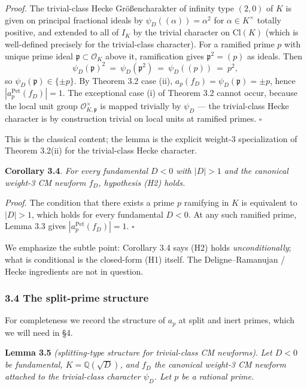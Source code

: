 \documentclass[
  11pt,
  a4paper,
]{amsart}
\begin{document}
\emph{Proof.} The trivial-class Hecke Größencharakter of infinity type \((2, 0)\) of \(K\) is given on principal fractional ideals by \(\psi_D((\alpha)) = \alpha^2\) for \(\alpha \in K^\times\) totally positive, and extended to all of \(I_K\) by the trivial character on \(\mathrm{Cl}(K)\) (which is well-defined precisely for the trivial-class character). For a ramified prime \(p\) with unique prime ideal \(\mathfrak{p} \subset \mathcal{O}_K\) above it, ramification gives \(\mathfrak{p}^2 = (p)\) as ideals. Then
\[
\psi_D(\mathfrak{p})^2 \ =\ \psi_D(\mathfrak{p}^2) \ =\ \psi_D((p)) \ =\ p^2,
\]
so \(\psi_D(\mathfrak{p}) \in \{\pm p\}\). By Theorem 3.2 case (ii), \(a_p(f_D) = \psi_D(\mathfrak{p}) = \pm p\), hence \(|a_p^{\mathrm{Pet}}(f_D)| = 1\). The exceptional case (i) of Theorem 3.2 cannot occur, because the local unit group \(\mathcal{O}_{K, \mathfrak{p}}^\times\) is mapped trivially by \(\psi_D\) --- the trivial-class Hecke character is by construction trivial on local units at ramified primes. \(\square\)

This is the classical content; the lemma is the explicit weight-3 specialization of Theorem 3.2(ii) for the trivial-class Hecke character.

\textbf{Corollary 3.4}. \emph{For every fundamental \(D < 0\) with \(|D| > 1\) and the canonical weight-3 CM newform \(f_D\), hypothesis (H2) holds.}

\emph{Proof.} The condition that there exists a prime \(p\) ramifying in \(K\) is equivalent to \(|D| > 1\), which holds for every fundamental \(D < 0\). At any such ramified prime, Lemma 3.3 gives \(|a_p^{\mathrm{Pet}}(f_D)| = 1\). \(\square\)

We emphasize the subtle point: Corollary 3.4 says (H2) holds \emph{unconditionally}; what is conditional is the closed-form (H1) itself. The Deligne--Ramanujan / Hecke ingredients are not in question.

\hypertarget{the-split-prime-structure}{%
\subsubsection{3.4 The split-prime structure}\label{the-split-prime-structure}}

For completeness we record the structure of \(a_p\) at split and inert primes, which we will need in §4.

\textbf{Lemma 3.5} \emph{(splitting-type structure for trivial-class CM newforms)}. \emph{Let \(D < 0\) be fundamental, \(K = \mathbb{Q}(\sqrt{D})\), and \(f_D\) the canonical weight-3 CM newform attached to the trivial-class character \(\psi_D\). Let \(p\) be a rational prime.}
\end{document}
